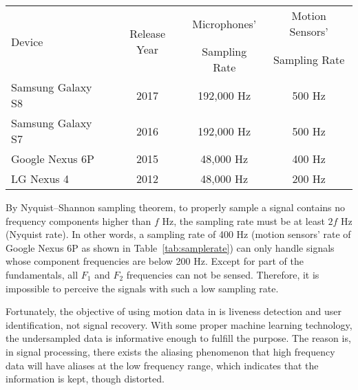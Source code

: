 \begin{table*}[h]
	\centering
	\caption[]{Maximum Sampling Rate of Smartphone Sensors}
	\label{tab:samplerate}
	\begin{tabular}{lccc} %
		\toprule		
				\multirow{2}{3cm}{Device}& \multirow{2}{2.5cm}{Release Year } & Microphones'  & Motion Sensors'  \\
	& & Sampling Rate & Sampling Rate\footnotemark \\
		\midrule
		Samsung Galaxy S8 & 2017 & 192,000 Hz & 500 Hz\\
		Samsung Galaxy S7 & 2016 & 192,000 Hz & 500 Hz\\		
		Google Nexus 6P & 2015 & 48,000 Hz & 400 Hz\\
		LG Nexus 4 & 2012 & 48,000 Hz& 200 Hz\\
		\bottomrule
	\end{tabular}
\end{table*}


By Nyquist–Shannon sampling theorem, to properly sample a signal contains no frequency components higher than $f$ Hz, the sampling rate must be at least $2f$ Hz (Nyquist rate). In other words, a sampling rate of 400 Hz (motion sensors' rate of Google Nexus 6P as shown in Table~\ref{tab:samplerate}) can only handle signals whose component frequencies are below 200 Hz. Except for part of the fundamentals, all $F_1$ and $F_2$ frequencies can not be sensed. Therefore, it is impossible to perceive the signals with such a low sampling rate.

Fortunately, the objective of using motion data in {\shortname} is liveness detection and user identification, not signal recovery. With some proper machine learning technology, the undersampled data is informative enough to fulfill the purpose. The reason is, in signal processing, there exists the aliasing phenomenon that high frequency data will have aliases at the low frequency range, which indicates that the information is kept, though distorted.

